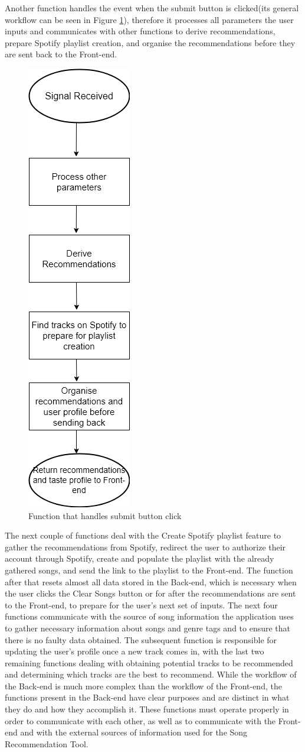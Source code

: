 \documentclass{l4proj}
\begin{document}
Another function handles the event when the submit button is clicked(its general workflow can be seen in Figure \ref{fig:submitworkflow}), therefore it processes all parameters the user inputs and communicates with other functions to derive recommendations, prepare Spotify playlist creation, and organise the recommendations before they are sent back to the Front-end.
\begin{figure}
    \centering
    \includegraphics[width=0.25\linewidth]{images/Submit.drawio.png}
    \caption{Function that handles submit button click}
    \label{fig:submitworkflow}
\end{figure}
The next couple of functions deal with the Create Spotify playlist feature to gather the recommendations from Spotify, redirect the user to authorize their account through Spotify, create and populate the playlist with the already gathered songs, and send the link to the playlist to the Front-end. The function after that resets almost all data stored in the Back-end, which is necessary when the user clicks the Clear Songs button or for after the recommendations are sent to the Front-end, to prepare for the user's next set of inputs. The next four functions communicate with the source of song information the application uses to gather necessary information about songs and genre tags and to ensure that there is no faulty data obtained. The subsequent function is responsible for updating the user's profile once a new track comes in, with the last two remaining functions dealing with obtaining potential tracks to be recommended and determining which tracks are the best to recommend. While the workflow of the Back-end is much more complex than the workflow of the Front-end, the functions present in the Back-end have clear purposes and are distinct in what they do and how they accomplish it. These functions must operate properly in order to communicate with each other, as well as to communicate with the Front-end and with the external sources of information used for the Song Recommendation Tool.
\end{document}
